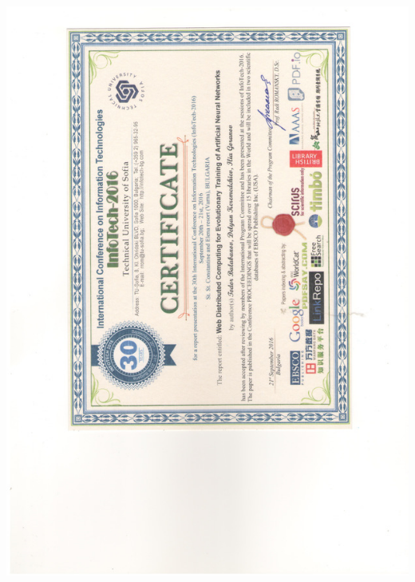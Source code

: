 \documentclass[bulgarian,a4paper]{europasscv}
\begin{document}
\includegraphics[width=\textwidth,height=\textheight,keepaspectratio]{InfoTech2016}
\end{document}
